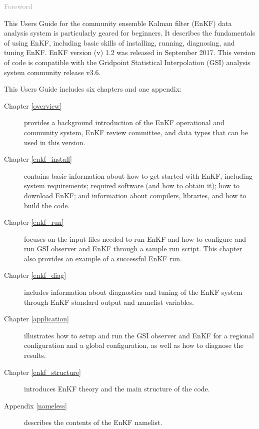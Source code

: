 \begin{titlepage}
\vspace*{0.5cm}
\noindent

\begin{flushleft}
\textcolor{darkgray}{\LARGE Foreword}
\vspace*{1cm}\par

This User\textquotesingle s Guide for the community ensemble Kalman filter (EnKF) data analysis system is particularly geared for beginners. 
It describes the fundamentals of using EnKF, including basic skills of installing, running, diagnosing, and tuning EnKF. EnKF version (v) 1.2 was released in September 2017. This version of code is compatible with the Gridpoint Statistical Interpolation (GSI) analysis system community release v3.6.

This User\textquotesingle s Guide includes six chapters and one appendix:

\begin{description}
\item[Chapter \ref{overview}] provides a background introduction of the EnKF operational and community system, EnKF review committee, and data types that can be used in this version.
\item[Chapter \ref{enkf_install}]  contains basic information about how to get started with EnKF, including system requirements; required software (and how to obtain it); how to download EnKF; and information about compilers, libraries, and how to build the code.
\item[Chapter \ref{enkf_run}] focuses on the input files needed to run EnKF and how to configure and run GSI observer and EnKF through a sample run script. This chapter also provides an example of a successful EnKF run.
\item[Chapter \ref{enkf_diag}] includes information about diagnostics and tuning of the EnKF system through EnKF standard output and namelist variables.
\item[Chapter \ref{application}] illustrates how to setup and run the GSI observer and EnKF for a regional configuration and a global configuration, as well as how to diagnose the results.
\item[Chapter \ref{enkf_structure}] introduces EnKF theory and the main structure of the code. 
\item[Appendix \ref{nameless}] describes the contents of the EnKF namelist.
\end{description}


\end{flushleft}
\end{titlepage}
